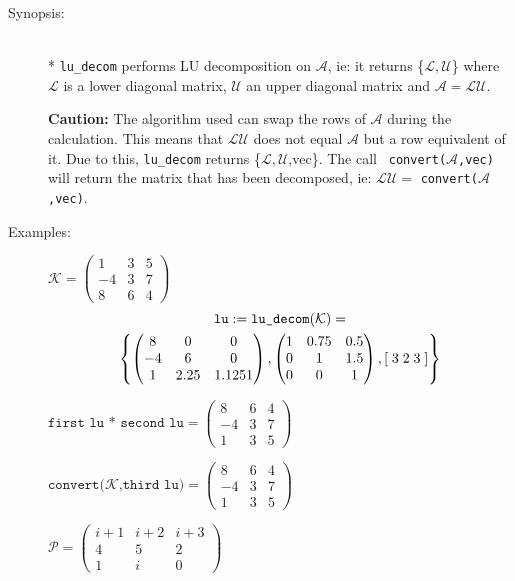 {\begin{description}
\item[Synopsis:]\mbox{}\\*
  {\tt lu\_decom} performs LU decomposition on $\mathcal{A}$, ie: it returns
  \{$\mathcal{L,U}$\} where $\mathcal{L}$ is a lower diagonal matrix, $\mathcal{U}$ an
  upper diagonal matrix and $\mathcal{A} = \mathcal{LU}$.

\textbf{Caution:}
  The algorithm used can swap the rows of $\mathcal{A}$ during the calculation. This
  means that $\mathcal{LU}$ does not equal $\mathcal{A}$ but a row equivalent of it. Due
  to this, \texttt{lu\_decom} returns \{$\mathcal{L,U}$,vec\}. The call {\tt
  convert($\mathcal{A}$,vec)} will return the matrix that has been decomposed, ie:
  $\mathcal{LU} = $ {\tt convert($\mathcal{A}$,vec)}.

\item[Examples:]
\(
\mathcal{K} = \begin{pmatrix} 1 & 3 & 5 \\ -4 & 3 & 7 \\ 8 & 6 & 4 \end{pmatrix}
\)
\begin{multline*}
\text{\texttt{lu}} := \text{\texttt{lu\_decom}} (\mathcal{K}) = \\
\left\{
        \begin{pmatrix} 8 & 0 & 0 \\ -4 & 6 & 0 \\ 1 & 2.25 & 1.125 1 \end{pmatrix},
        \begin{pmatrix} 1 & 0.75 & 0.5 \\ 0 & 1 & 1.5 \\ 0 & 0 & 1 \end{pmatrix},
	[\; 3 \; 2 \; 3 \; ]
\right\}
\end{multline*}

\(\texttt{first lu * second lu} =
        \begin{pmatrix} 8 & 6 & 4 \\ -4 & 3 & 7 \\ 1 & 3 & 5 \end{pmatrix}\)

\(\texttt{convert($\mathcal{K}$,third lu)} =
        \begin{pmatrix} 8 & 6 & 4 \\ -4 & 3 & 7 \\ 1 & 3 & 5 \end{pmatrix}\)

\(
\mathcal{P} = \begin{pmatrix} i+1 & i+2 & i+3 \\ 4 & 5 & 2 \\ 1 & i & 0 \end{pmatrix}
\)


\end{description}}
